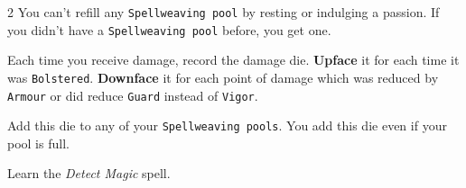 \begin{multicols*}{2}
    You can't refill any \texttt{Spellweaving pool} by resting or indulging a passion. If you didn't have a \texttt{Spellweaving pool} before, you get one. 

    Each time you receive damage, record the damage die. \textbf{Upface} it for each time it was \texttt{Bolstered}. \textbf{Downface} it for each point of damage which was reduced by \texttt{Armour} or did reduce \texttt{Guard} instead of \texttt{Vigor}.

    Add this die to any of your \texttt{Spellweaving pools}. You add this die even if your pool is full. 

    Learn the \emph{Detect Magic} spell.

\end{multicols*}
